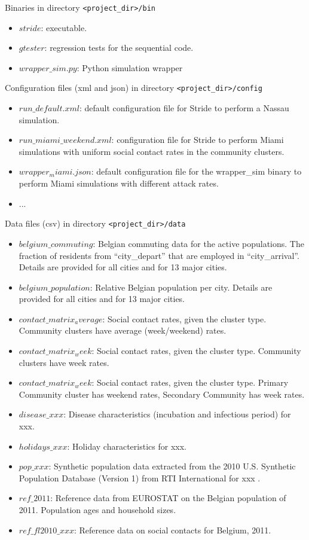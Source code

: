 \begin{compactitem}
    \item Binaries 
    		in directory \texttt{<project\_dir>/bin}
      	\begin{itemize}
        		\item $stride$: executable.
		\item $gtester$: regression tests for the sequential code.
        		\item $wrapper\_sim.py$: Python simulation wrapper  		
        \end{itemize}
    \item Configuration files (xml and json)
      	in directory \texttt{<project\_dir>/config}
      	\begin{itemize}
		\item $run\_default.xml$: default configuration file for Stride to perform a Nassau simulation.
        		\item $run\_miami\_weekend.xml$: configuration file for Stride to perform Miami simulations with uniform social contact rates in the community clusters.
		\item $wrapper_miami.json$: default configuration file for the wrapper\_sim binary to perform Miami simulations with different attack rates.
		\item ...
        \end{itemize}
    \item Data files (csv)
      	in directory \texttt{<project\_dir>/data}
      	\begin{itemize}
        		\item $belgium\_commuting$: Belgian commuting data for the active populations. The fraction of residents from ``city\_depart'' that are employed in ``city\_arrival''. Details are provided for all cities and for 13 major cities.
		\item $belgium\_population$: Relative Belgian population per city. Details are provided for all cities and for 13 major cities.
		\item $contact\_matrix_average$: Social contact rates, given the cluster type. Community clusters have average (week/weekend) rates.
		\item $contact\_matrix_week$: Social contact rates, given the cluster type. Community clusters have week rates.
		\item $contact\_matrix_week$: Social contact rates, given the cluster type. Primary Community cluster has weekend rates, Secondary Community has week rates.
		\item $disease\_xxx$: Disease characteristics (incubation and infectious period) for xxx.
		\item $holidays\_xxx$: Holiday characteristics for xxx.
		\item $pop\_xxx$: Synthetic population data extracted from the 2010 U.S. Synthetic Population Database (Version 1) from RTI International for xxx \cite{wheaton2014a,wheaton2014b}. 
		\item $ref\_2011$: Reference data from EUROSTAT on the Belgian population of 2011. Population ages and household sizes.
		\item $ref\_fl2010\_xxx$: Reference data on social contacts for Belgium, 2011. 


\end{itemize}
\end{compactitem}

